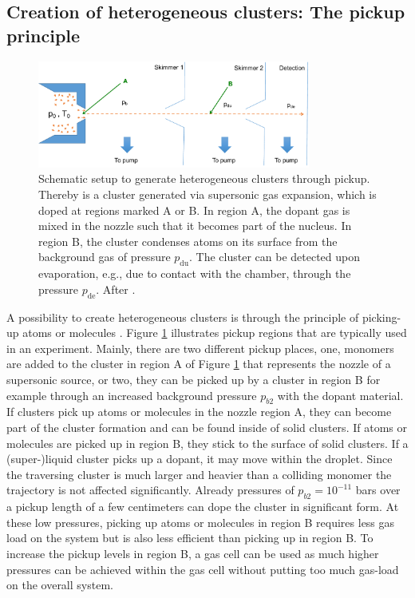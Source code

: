 \subsection{Creation of heterogeneous clusters: The pickup principle}\label{sec:heterogeneous-cluster}
\begin{figure}
	\centering
		\includegraphics[width=0.80\textwidth]{images/pick-up.pdf}
	\caption[Schematic of a pickup (gas-)source.]{Schematic setup to generate heterogeneous clusters through pickup. Thereby is a cluster generated via supersonic gas expansion, which is doped at regions marked A or B. In region A, the dopant gas is mixed in the nozzle such that it becomes part of the nucleus. In region B, the cluster condenses atoms on its surface from the background gas of pressure $p_{\text{du}}$. The cluster can be detected upon evaporation, e.g., due to contact with the chamber, through the pressure $p_{\text{de}}$. After \cite{Gough-1985-JChemPhys,Haberland-1994-Springer}.}
	\label{fig:pickupPrinciple}
\end{figure}
A possibility to create heterogeneous clusters is through the principle of picking-up atoms or molecules \cite{Gough-1985-JChemPhys,Haberland-1994-Springer}. Figure \ref{fig:pickupPrinciple} illustrates pickup regions that are typically used in an experiment. Mainly, there are two different pickup places, one, monomers are added to the cluster in region A of Figure \ref{fig:pickupPrinciple} that represents the nozzle of a supersonic source, or two, they can be picked up by a cluster in region B for example through an increased background pressure $p_{b2}$ with the dopant material. If clusters pick up atoms or molecules in the nozzle region A, they can become part of the cluster formation and can be found inside of solid clusters. If atoms or molecules are picked up in region B, they stick to the surface of solid clusters. If a (super-)liquid cluster picks up a dopant, it may move within the droplet. Since the traversing cluster is much larger and heavier than a colliding monomer the trajectory is not affected significantly. Already pressures of $p_{b2}=10^{-11}$ bars over a pickup length of a few centimeters can dope the cluster in significant form. At these low pressures, picking up atoms or molecules in region B requires less gas load on the system but is also less efficient than picking up in region B. To increase the pickup levels in region B, a gas cell can be used as much higher pressures can be achieved within the gas cell without putting too much gas-load on the overall system.\\
